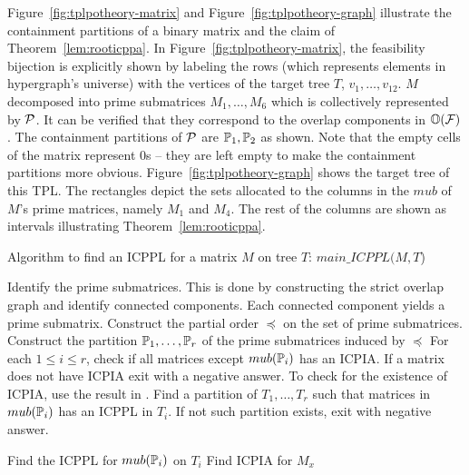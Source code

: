 Figure~\ref{fig:tplpotheory-matrix} and
Figure~\ref{fig:tplpotheory-graph} illustrate the containment
partitions of a binary matrix and the claim of
Theorem~\ref{lem:rooticppa}. In Figure~\ref{fig:tplpotheory-matrix},
the feasibility bijection is explicitly shown by labeling the rows
(which represents elements in hypergraph's universe) with the vertices
of the target tree $T$, $v_1, \ldots, v_{12}$.  $M$ decomposed into
prime submatrices $M_1, \ldots, M_6$ which is collectively represented
by ${\cal P}$. It can be verified that they correspond to the overlap
components in $\mathbb O({\cal F})$. The containment partitions of ${\cal P}$ are
$\mathbb P_1, \mathbb P_2$ as shown. Note that the empty cells of the matrix
represent 0s -- they are left empty to make the containment partitions
more obvious.  Figure~\ref{fig:tplpotheory-graph} shows the target
tree of this TPL. The rectangles depict the sets allocated to the
columns in the $mub$ of $M$'s prime matrices, namely $M_1$ and
$M_4$. The rest of the columns are shown as intervals illustrating
Theorem~\ref{lem:rooticppa}.

\begin{algorithm}[h]
  \caption{Algorithm to find an ICPPL for a matrix $M$ on tree $T$:
    $main\_ICPPL(M, T$)}
  \label{al:icppa-main}
  \begin{algorithmic}[\lndisplay]
    \STATE Identify the prime submatrices. This is done by
    constructing the strict overlap graph and identify connected
    components.  Each connected component yields a prime submatrix.%
    \STATE Construct the partial order $\preccurlyeq$ on the set of
    prime submatrices.%
    \STATE Construct the partition $\mathbb P_1, \ldots, \mathbb P_r$ of the prime
    submatrices induced by $\preccurlyeq$%
    \STATE For each $1 \leq i \leq r$, check if all matrices except
    $mub(\mathbb P_i)$ has an ICPIA.  If a matrix does not have ICPIA exit
    with a negative answer.  To check for the existence of ICPIA, use
    the result in \cite{nsnrs09}.%
    \STATE \label{ln:findtreepartition} Find a partition of $T_1, \ldots, T_r$ such that matrices
    in $mub(\mathbb P_i)$ has an ICPPL in $T_i$.  If not such partition
    exists, exit with negative answer.%

    \STATE \label{ln:findrooticppl} Find the ICPPL for $mub(\mathbb P_i)$ on $T_i$%
    \STATE Find ICPIA for $M_x$ %
    \ENDFOR
    \ENDFOR
  \end{algorithmic}
\end{algorithm}

